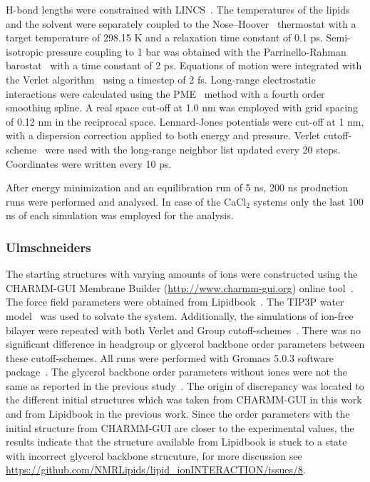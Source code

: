 \documentclass[twoside,twocolumn,9pt]{article}
\begin{document}
H-bond lengths were constrained with LINCS~\cite{hess97,hess07}. The temperatures of the lipids and the solvent were separately coupled to the 
Nose--Hoover~\cite{nose84,hoover85} thermostat with a target temperature of 298.15 K and a relaxation time constant of 0.1 ps. Semi-isotropic pressure 
coupling to 1 bar was obtained with the Parrinello-Rahman barostat~\cite{parrinello81} with a time constant of 2 ps. Equations of motion were integrated 
with the Verlet algorithm~\cite{pall13} using a timestep of 2 fs. Long-range electrostatic interactions were calculated using the PME~\cite{darden93,essman95} method 
with a fourth order smoothing spline. A real space cut-off at 1.0 nm was employed with grid spacing of 0.12 nm in the reciprocal space. 
Lennard-Jones potentials were cut-off at 1 nm, with a dispersion correction applied to both energy and pressure. Verlet cutoff-scheme~\cite{pall13} 
were used with the long-range neighbor list updated every 20 steps. Coordinates were written every 10 ps.

After energy minimization and an equilibration run of 5 ns, 200 ns production runs were performed and analysed. In case of the CaCl$_2$ systems 
only the last 100 ns of each simulation was employed for the analysis.

\subsubsection{Ulmschneiders}
The starting structures with varying amounts of ions were constructed using the CHARMM-GUI Membrane Builder (\url{http://www.charmm-gui.org}) 
online tool~\cite{lee15}. The force field parameters were obtained from Lipidbook~\cite{domanski10}. The TIP3P water model~\cite{jorgensen83} 
was used to solvate the system.  Additionally, the simulations of ion-free bilayer were repeated with both Verlet and Group cutoff-schemes~\cite{ulmschneiderPOPC0mMNaClfiles}. 
There was no significant difference in headgroup or glycerol backbone order parameters between these cutoff-schemes. All runs were performed with Gromacs 5.0.3 software package~\cite{abraham15}. 
The glycerol backbone order parameters without iones were not the same as reported in the previous study~\cite{botan15}.
The origin of discrepancy was located to the different initial structures which was taken from CHARMM-GUI in this work
and from Lipidbook in the previous work. Since the order parameters with the initial structure from CHARMM-GUI are
closer to the experimental values, the results indicate that the structure available from Lipidbook is stuck to a
state with incorrect glycerol backbone strucuture, for more discussion see \url{https://github.com/NMRLipids/lipid_ionINTERACTION/issues/8}.
\end{document}
